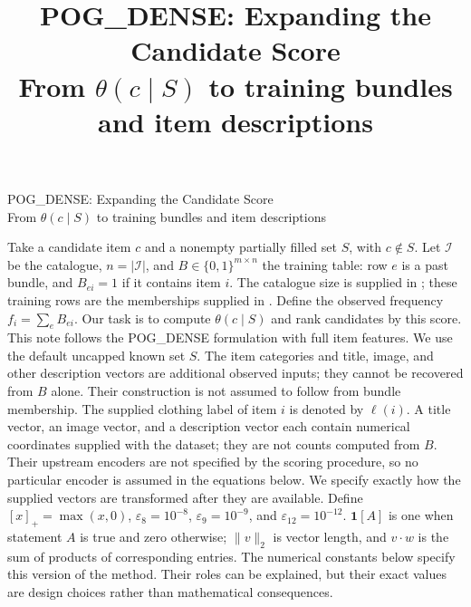 \documentclass[11pt,a4paper]{article}
\title{\textcolor{ink}{POG\_DENSE: Expanding the Candidate Score}\\[4pt]
\large From $\theta(c\mid S)$ to training bundles and item descriptions}
\author{}\date{}
\newcommand{\I}{\mathcal I}\newcommand{\pos}[1]{\left[#1\right]_+}
\numberwithin{equation}{section}
\begin{document}
\begin{center}
{\LARGE\textcolor{ink}{POG\_DENSE: Expanding the Candidate Score}}\\[6pt]
{\large From $\theta(c\mid S)$ to training bundles and item descriptions}
\end{center}\medskip
Take a candidate item $c$ and a nonempty partially filled set $S$, with $c\notin S$.
Let $\I$ be the catalogue, $n=|\I|$, and $B\in\{0,1\}^{m\times n}$ the training table:
row $e$ is a past bundle, and $B_{ei}=1$ if it contains item $i$.
The catalogue size is supplied in ; these training rows are
the memberships supplied in . Define the observed
frequency $f_i=\sum_e B_{ei}$. Our task is to compute $\theta(c\mid S)$ and rank candidates
by this score. This note follows the POG\_DENSE formulation with full item features.
We use the default uncapped known set $S$. The item categories and title, image, and
other description vectors are additional observed inputs; they cannot be recovered from
$B$ alone. Their construction is not assumed to follow from bundle membership.
The supplied clothing label of item $i$ is denoted by $\ell(i)$. A title vector,
an image vector, and a description vector each contain numerical coordinates
supplied with the dataset; they are not counts computed from $B$. Their upstream
encoders are not specified by the scoring procedure, so no particular encoder
is assumed in the equations below. We specify exactly how the supplied vectors
are transformed after they are available.
Define $[x]_+=\max(x,0)$, $\varepsilon_8=10^{-8}$,
$\varepsilon_9=10^{-9}$, and $\varepsilon_{12}=10^{-12}$.
$\mathbf1[A]$ is one when statement $A$ is true and zero otherwise; $\lVert v\rVert_2$
is vector length, and $v\cdot w$ is the sum of products of corresponding entries.
The numerical constants below specify this version of the method. Their roles can be
explained, but their exact values are design choices rather than mathematical consequences.
\end{document}
